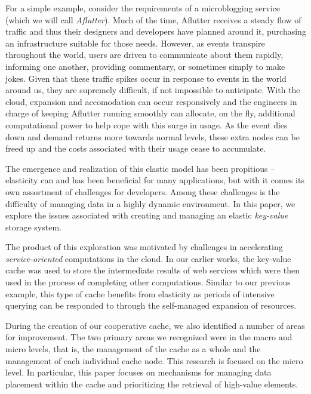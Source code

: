 For a simple example, consider the requirements of a microblogging service
(which we will call \emph{Aflutter}). Much of the time, Aflutter receives a
steady flow of traffic and thus their designers and developers have planned
around it, purchasing an infrastructure suitable for those needs. However, as
events transpire throughout the world, users are driven to communicate about
them rapidly, informing one another, providing commentary, or sometimes simply
to make jokes. Given that these traffic spikes occur in response to events in
the world around us, they are supremely difficult, if not impossible to
anticipate. With the cloud, expansion and accomodation can occur responsively
and the engineers in charge of keeping Aflutter running smoothly can allocate,
on the fly, additional computational power to help cope with this surge in
usage. As the event dies down and demand returns more towards normal levels,
these extra nodes can be freed up and the costs associated with their usage
cease to accumulate.

The emergence and realization of this elastic model has been propitious --
elasticity can and has been beneficial for many applications, but with it comes
its own assortment of challenges for developers. Among these challenges is the
difficulty of managing data in a highly dynamic environment. In this paper, we
explore the issues associated with creating and managing an elastic
\emph{key-value} storage system.

The product of this exploration was motivated by challenges in accelerating
\emph{service-oriented} computations in the cloud. In our earlier works, the
key-value cache was used to store the intermediate results of web services
which were then used in the process of completing other computations.  Similar
to our previous example, this type of cache benefits from elasticity as periods
of intensive querying can be responded to through the self-managed expansion of
resources.

During the creation of our cooperative cache, we also identified a number of
areas for improvement. The two primary areas we recognized were in the macro
and micro levels, that is, the management of the cache as a whole and the
management of each individual cache node. This research is focused on the micro
level. In particular, this paper focuses on mechanisms for managing data
placement within the cache and prioritizing the retrieval of high-value
elements.

